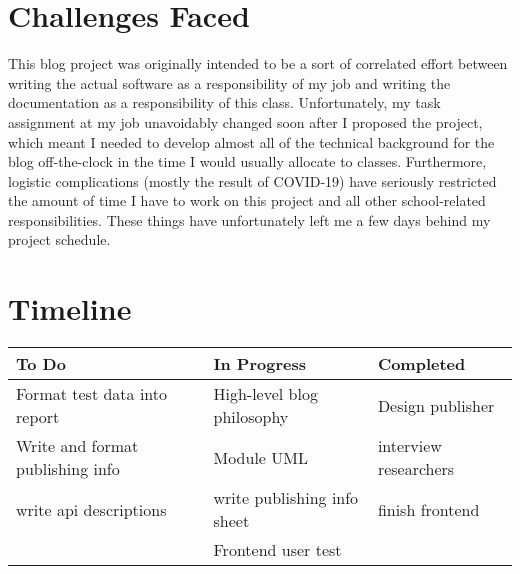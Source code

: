 \documentclass[12pt]{article}
\begin{document}
\section{Challenges Faced}

This blog project was originally intended to be a sort of correlated effort between writing the actual software as a responsibility of my job and writing the documentation as a responsibility of this class. Unfortunately, my task assignment at my job unavoidably changed soon after I proposed the project, which meant I needed to develop almost all of the technical background for the blog off-the-clock in the time I would usually allocate to classes.  Furthermore, logistic complications (mostly the result of COVID-19) have seriously restricted the amount of time I have to work on this project and all other school-related responsibilities. These things have unfortunately left me a few days behind my project schedule.

\section{Timeline}

\begin{tabular}{l | l | l }
To Do&In Progress&Completed\\\hline
Format test data into report&High-level blog philosophy&Design publisher\\
Write and format publishing info&Module UML& interview researchers \\
write api descriptions&write publishing info sheet&finish frontend\\
&Frontend user test&\\


\end{tabular}

%

\nocite{Brooke18}
\nocite{Melbourne15}
\nocite{Ceta20}
\nocite{Andrew18}

\printbibliography
\end{document}

